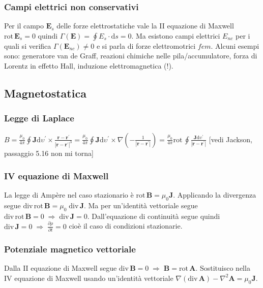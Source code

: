 \documentclass[11pt,a4paper]{article}
\newcommand{\de}{\mathrm d}
\newcommand{\fracp}[2]{\frac{\partial #1}{\partial #2}}
\newcommand{\dive}[1]{\text{div}\,#1}
\newcommand{\rot}[1]{\text{rot}\,#1}
\begin{document}
\subsubsection{Campi elettrici non conservativi}
Per il campo $\mathbf E_s$ delle forze elettrostatiche vale la II equazione di Maxwell $\rot\mathbf E_s = 0$ quindi $\Gamma(\mathbf E) = \oint E_s\cdot\de s = 0$. Ma esistono campi elettrici $E_{nc}$ per i quali si verifica $\Gamma(\mathbf E_{nc}) \neq 0$ e si parla di forze elettromotrici $fem$. Alcuni esempi sono:
generatore van de Graff, reazioni chimiche nelle pila/accumulatore, forza di Lorentz in effetto Hall, induzione elettromagnetica (!).

\subsection{Magnetostatica}
\subsubsection{Legge di Laplace}
$B = \frac{\mu_0}{4\pi} \oint \mathbf J \de\upsilon^\prime \times \frac{\mathbf r - \mathbf r^\prime}{|\mathbf r - \mathbf r^\prime|^3} = \frac{\mu_0}{4\pi} \oint \mathbf J \de\upsilon^\prime \times \nabla(-\frac1 {|\mathbf r-\mathbf r^\prime|}) = \frac{\mu_0}{4\pi} \rot \oint \frac{\mathbf J \de\upsilon^\prime}{|\mathbf r-\mathbf r^\prime|}$ [vedi Jackson, passaggio 5.16 non mi torna]

\subsubsection{IV equazione di Maxwell} 
La legge di Ampère nel caso stazionario è $\rot\mathbf B = \mu_0 \mathbf J$. Applicando la divergenza segue $\dive\rot \mathbf B = \mu_0\; \dive\mathbf J$. Ma per un'identità vettoriale segue $\dive\rot\mathbf B= 0 \;\Longrightarrow\; \dive\mathbf J = 0$. Dall'equazione di continuità segue quindi $\dive\mathbf J = 0 \;\Longrightarrow\; \fracp{\rho}{t} = 0$ cioè il caso di condizioni stazionarie.

\subsubsection{Potenziale magnetico vettoriale}
Dalla II equazione di Maxwell segue $\dive\mathbf B = 0 \;\Rightarrow\; \mathbf B = \rot\mathbf A$. Sostituisco nella IV equazione di Maxwell usando un'identità vettoriale  $\nabla(\dive\mathbf A) - \nabla^2\mathbf A = \mu_0 \mathbf J$.
\end{document}

